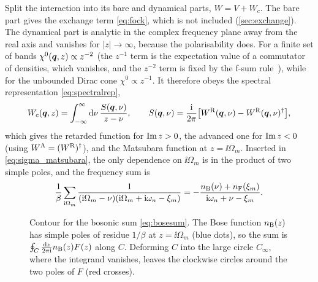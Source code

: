 Split the interaction into its bare and dynamical parts, $W=V+W_c$. The bare part gives the exchange term
\eqref{eq:fock}, which is not included (\cref{sec:exchange}). The dynamical part is analytic in the complex
frequency plane away from the real axis and vanishes for $|z|\to\infty$, because the polarisability does. For a finite set of bands $\chi^0(\bm q,z)\propto z^{-2}$
(the $z^{-1}$ term is the expectation value of a commutator of densities, which vanishes, and the $z^{-2}$ term is fixed
by the f-sum rule~\cite{GiulianiVignale}), while for the unbounded Dirac cone $\chi^0\propto z^{-1}$. It therefore obeys the spectral representation
\eqref{eq:spectralrep},
\begin{equation}
W_c(\bm q,z)=\int_{-\infty}^{\infty}\mathrm d\nu\,\frac{S(\bm q,\nu)}{z-\nu},\qquad
S(\bm q,\nu)=\frac{\mathrm i}{2\pi}\bigl[W^{\rm R}(\bm q,\nu)-W^{\rm R}(\bm q,\nu)^\dagger\bigr],
\label{eq:Wc_spectral}
\end{equation}
which gives the retarded function for $\operatorname{Im} z>0$, the advanced one for $\operatorname{Im} z<0$ (using
$W^{\rm A}=(W^{\rm R})^\dagger$), and the Matsubara function at $z=\ii\Omega_m$. Inserted in
\cref{eq:sigma_matsubara}, the only dependence on $\ii\Omega_m$ is in the product of two simple poles, and the
frequency sum is
\begin{equation}
\frac1\beta\sum_{\mathrm i\Omega_m}\frac{1}{(\mathrm i\Omega_m-\nu)(\mathrm i\Omega_m+\mathrm i\omega_n-\xi_m)}
=-\frac{n_{\rm B}(\nu)+n_{\rm F}(\xi_m)}{\mathrm i\omega_n+\nu-\xi_m} .
\label{eq:bosesum}
\end{equation}

\begin{figure}[t]
\centering
{}
\caption{Contour for the bosonic sum \eqref{eq:bosesum}. The Bose function $n_{\rm B}(z)$ has simple poles of residue
$1/\beta$ at $z=\ii\Omega_m$ (blue dots), so the sum is $\oint_C\frac{\mathrm d z}{2\pi\mathrm i}n_{\rm B}(z)F(z)$ along $C$. Deforming $C$
into the large circle $C_\infty$, where the integrand vanishes, leaves the clockwise circles around the two poles of
$F$ (red crosses).}
\label{fig:contour}
\end{figure}

